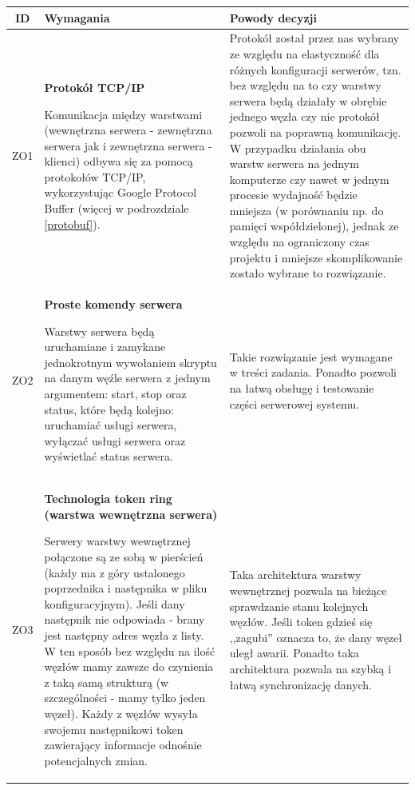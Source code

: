 \begin{tabularx}{\textwidth}{|c|X|X|}
\hline
\textbf{ID} & \textbf{Wymagania}  & \textbf{Powody decyzji} \\
\hline

\label{z:ZO1} ZO1 &  \textbf{Protokół TCP/IP }

Komunikacja między warstwami (wewnętrzna serwera - zewnętrzna serwera jak i zewnętrzna serwera - klienci) odbywa się za pomocą protokołów TCP/IP, wykorzystując Google Protocol Buffer (więcej w podrozdziale \ref{protobuf}). & 
Protokół został przez nas wybrany ze względu na elastyczność dla różnych konfiguracji serwerów, tzn. bez względu na to czy warstwy serwera będą działały w obrębie jednego węzła czy nie protokół pozwoli na poprawną komunikację. W przypadku działania obu warstw serwera na jednym komputerze czy nawet w jednym procesie wydajność będzie mniejsza (w porównaniu np. do pamięci współdzielonej), jednak ze względu na ograniczony czas projektu i mniejsze skomplikowanie zostało wybrane to rozwiązanie. \\
\hline

\label{z:ZO2} ZO2 &  \textbf{Proste komendy serwera}

Warstwy serwera będą uruchamiane i zamykane jednokrotnym wywołaniem skryptu na danym węźle serwera z jednym argumentem: start, stop oraz status, które będą kolejno: uruchamiać usługi serwera, wyłączać usługi serwera oraz wyświetlać status serwera. & 
Takie rozwiązanie jest wymagane w treści zadania. Ponadto pozwoli na łatwą obsługę i testowanie części serwerowej systemu. \\
\hline

\label{z:ZO3} ZO3 &  \textbf{Technologia token ring (warstwa wewnętrzna serwera)}

Serwery warstwy wewnętrznej połączone są ze sobą w pierścień (każdy ma z góry ustalonego poprzednika i następnika w pliku konfiguracyjnym). Jeśli dany następnik nie odpowiada - brany jest następny adres węzła z listy. W ten sposób bez względu na ilość węzłów mamy zawsze do czynienia z taką samą strukturą (w szczególności - mamy tylko jeden węzeł). Każdy z węzłów wysyła swojemu następnikowi token zawierający informacje odnośnie potencjalnych zmian. & 
Taka architektura warstwy wewnętrznej pozwala na bieżące sprawdzanie stanu kolejnych węzłów. Jeśli token gdzieś się ,,zagubi'' oznacza to, że dany węzeł uległ awarii. Ponadto taka architektura pozwala na szybką i łatwą synchronizację danych. \\
\hline

\end{tabularx}

